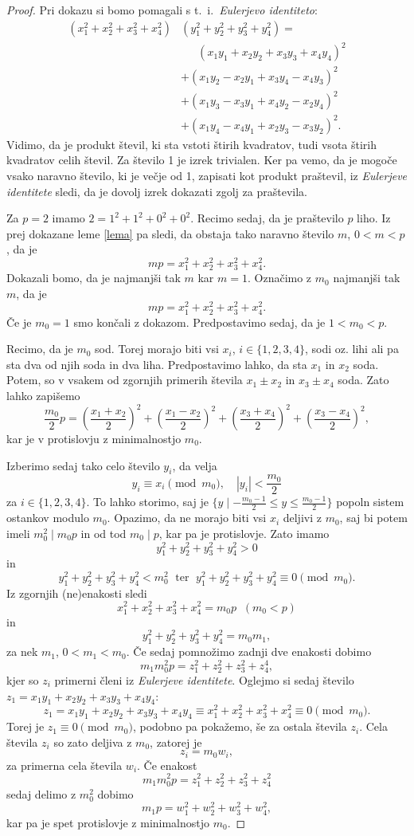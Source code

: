 \documentclass[a4paper]{amsart}
\theoremstyle{definition}
\theoremstyle{plain}
\numberwithin{equation}{section}
\begin{document}
\begin{proof}
	Pri dokazu si bomo pomagali s t.\ i.\ \emph{Eulerjevo identiteto}:
	\begin{align*}
		(x_1^2+x_2^2+x_3^2+x_4^2)&(y_1^2+y_2^2+y_3^2+y_4^2) =\\
								 &\phantom{.+} (x_1y_1+x_2y_2+x_3y_3+x_4y_4)^2\\
								 &+ (x_1y_2-x_2y_1+x_3y_4-x_4y_3)^2\\
								 &+ (x_1y_3-x_3y_1+x_4y_2-x_2y_4)^2\\
								 &+ (x_1y_4-x_4y_1+x_2y_3-x_3y_2)^2 .    
	  \end{align*}
	Vidimo, da je produkt števil, ki sta vstoti štirih kvadratov, tudi vsota štirih kvadratov celih števil. Za število 1 je izrek trivialen. Ker pa vemo, da je mogoče vsako naravno število, ki je večje od 1, zapisati kot produkt praštevil, iz \emph{Eulerjeve identitete} sledi, da je dovolj izrek dokazati zgolj za praštevila.

	Za $p=2$ imamo $2=1^2+1^2+0^2+0^2$. Recimo sedaj, da je praštevilo $p$ liho. Iz prej dokazane leme \ref{lema} pa sledi, da obstaja tako naravno število $m$, $0<m<p$, da je $$mp=x_1^2+x_2^2+x_3^2+x_4^2.$$ Dokazali bomo, da je najmanjši tak $m$ kar $m=1$. Označimo z $m_0$ najmanjši tak $m$, da je $$mp=x_1^2+x_2^2+x_3^2+x_4^2.$$ Če je $m_0=1$ smo končali z dokazom. Predpostavimo sedaj, da je $1<m_0<p$.

	Recimo, da je $m_0$ sod. Torej morajo biti vsi $x_i$, $i\in\{1,2,3,4\}$, sodi oz. lihi ali pa sta dva od njih soda in dva liha. Predpostavimo lahko, da sta $x_1$ in $x_2$ soda. Potem, so v vsakem od zgornjih primerih števila $x_1\pm x_2$ in $x_3\pm x_4$ soda. Zato lahko zapišemo $$\frac{m_0}{2}p=\left(\frac{x_1+x_2}{2}\right)^2 + \left(\frac{x_1-x_2}{2}\right)^2 + \left(\frac{x_3+x_4}{2}\right)^2 + \left(\frac{x_3-x_4}{2}\right)^2,$$ kar je v protislovju z minimalnostjo $m_0$.

	Izberimo sedaj tako celo število $y_i$, da velja $$y_i \equiv x_i \pmod{m_0}, \quad |y_i|<\frac{m_0}{2}$$ za $i\in\{1,2,3,4\}$. To lahko storimo, saj je $\{y \mid -\frac{m_0-1}{2}\leqslant y \leqslant \frac{m_0-1}{2} \}$ popoln sistem ostankov modulo $m_0$. Opazimo, da ne morajo biti vsi $x_i$ deljivi z $m_0$, saj bi potem imeli $m_0^2\mid m_0 p$ in od tod $m_0 \mid p$, kar pa je protislovje. Zato imamo $$y_1^2+y_2^2+y_3^2+y_4^2 >0$$ in  $$y_1^2+y_2^2+y_3^2+y_4^2 < m_0^2\; \text{ ter }\;  y_1^2+y_2^2+y_3^2+y_4^2 \equiv 0\pmod{m_0}.$$ Iz zgornjih (ne)enakosti sledi $$x_1^2+x_2^2+x_3^2+x_4^2 = m_0p \;\; (m_0<p)$$ 
	in $$y_1^2+y_2^2+y_3^2+y_4^2 = m_0 m_1,$$ za nek $m_1$, $0<m_1<m_0$. Če sedaj pomnožimo zadnji dve enakosti dobimo $$m_1m_0^2p=z_1^2+z_2^2+z_3^2+z_4^4,$$ kjer so $z_i$ primerni členi iz \emph{Eulerjeve identitete}. Oglejmo si sedaj število $z_1=x_1y_1+x_2y_2+x_3y_3+x_4y_4$: $$z_1 = x_1y_1+x_2y_2+x_3y_3+x_4y_4 \equiv  x_1^2+x_2^2+x_3^2+x_4^2 \equiv 0 \pmod{m_0}.$$ Torej je $z_1\equiv 0 \pmod{m_0}$, podobno pa pokažemo, še za ostala števila $z_i$. Cela števila $z_i$ so zato deljiva z $m_0$, zatorej je $$z_i = m_0w_i,$$ za primerna cela števila $w_i$. Če enakost $$m_1 m_0^2 p = z_1^2+z_2^2+z_3^2+z_4^2$$ sedaj delimo z $m_0^2$ dobimo $$m_1p = w_1^2+w_2^2+w_3^2+w_4^2,$$ kar pa je spet protislovje z minimalnostjo $m_0$.


\end{proof}
\end{document}
